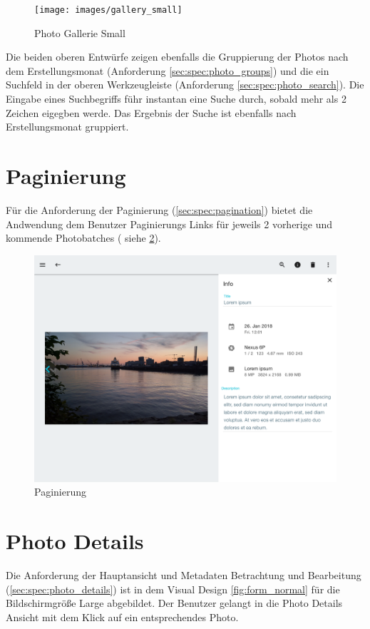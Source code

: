 \begin{figure}[htp]     %
\centering
\texttt{[image: images/gallery\_small]} 
\caption{Photo Gallerie Small}\label{fig:gallery_small}
\end{figure}

Die beiden oberen Entwürfe zeigen ebenfalls die Gruppierung der Photos nach dem Erstellungsmonat (Anforderung \ref{sec:spec:photo_groups}) und die ein Suchfeld in der oberen Werkzeugleiste (Anforderung \ref{sec:spec:photo_search}). Die Eingabe eines Suchbegriffs führ instantan eine Suche durch, sobald mehr als 2 Zeichen eigegben werde. Das Ergebnis der Suche ist ebenfalls nach Erstellungsmonat gruppiert.

\section{Paginierung}

Für die Anforderung der Paginierung (\ref{sec:spec:pagination}) bietet die Andwendung dem Benutzer Paginierungs Links für jeweils 2 vorherige und kommende Photobatches ( siehe \ref{fig:pagination}).

\begin{figure}[htp]     %
\centering
\includegraphics[width=1.0\textwidth]{images/form_normal} 
\caption{Paginierung}\label{fig:pagination}
\end{figure}

\section{Photo Details}
Die Anforderung der Hauptansicht und Metadaten Betrachtung und Bearbeitung (\ref{sec:spec:photo_details}) ist in dem Visual Design  \ref{fig:form_normal} für die Bildschirmgröße Large abgebildet. Der Benutzer gelangt in die Photo Details Ansicht mit dem Klick auf ein entsprechendes Photo. 

